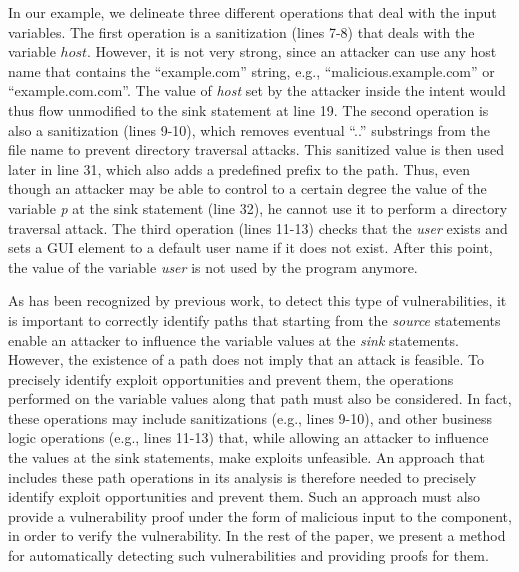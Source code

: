 In our example, we delineate three different operations that deal with the input variables. The first operation is a sanitization (lines 7-8) that deals with the variable $host$. However, it is not very strong, since an attacker can use any host name that contains the ``example.com'' string, e.g., ``malicious.example.com'' or ``example.com.com''. The value of \textit{host} set by the attacker inside the intent would thus flow unmodified to the sink statement at line 19. The second operation is also a sanitization (lines 9-10), which removes eventual ``..'' substrings from the file name to prevent directory traversal attacks. This sanitized value is then used later in line 31, which also adds a predefined prefix to the path. Thus, even though an attacker may be able to control to a certain degree the value of the variable \textit{p} at the sink statement (line 32), he cannot use it to perform a directory traversal attack. The third operation (lines 11-13) checks that the \textit{user} exists and sets a GUI element to a default user name if it does not exist. After this point, the value of the variable \textit{user} is not used by the program anymore. 

As has been recognized by previous work, to detect this type of vulnerabilities, it is important to correctly identify paths that starting from the \textit{source} statements enable an attacker to influence the variable values at the \textit{sink} statements. However, the existence of a path does not imply that an attack is feasible. To precisely identify exploit opportunities and prevent them, the operations performed on the variable values along that path must also be considered. In fact, these operations may include  sanitizations (e.g., lines 9-10), and other business logic operations (e.g., lines 11-13) that, while allowing an attacker to influence the values at the sink statements, make exploits unfeasible. An approach that includes these path operations in its analysis is therefore needed to precisely identify exploit opportunities and prevent them. Such an approach must also provide a vulnerability proof under the form of malicious input to the component, in order to verify the vulnerability. In the rest of the paper, we present a method for automatically detecting such vulnerabilities and providing proofs for them. 


